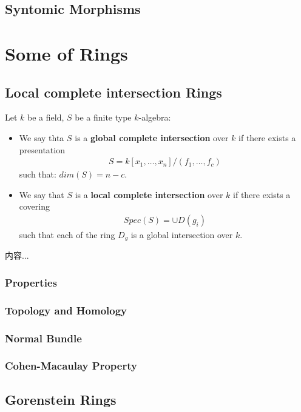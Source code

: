 \documentclass[Total.tex]{subfiles}
\begin{document}
		\section{Syntomic Morphisms}
	\chapter{Some of Rings}
		
		\section{Local complete intersection Rings}
			\begin{Def}
				Let $k$ be a field, $S$ be a finite type $k$-algebra:
				\begin{itemize}
					\item We say thta $S$ is a \textbf{global complete intersection} over $k$ if there exists a presentation
					\begin{gather*}
						S=k[x_1,\dots,x_n]/(f_1,\dots,f_c)
					\end{gather*}
					such that: $dim(S)=n-c$.
					\item We say that $S$ is a \textbf{local complete intersection} over $k$ if there exists a covering
					\begin{gather*}
						Spec(S)=\cup D(g_i)
					\end{gather*}
					such that each of the ring $D_g$ is a global intersection over $k$.
				\end{itemize}
			\end{Def}
			
			\begin{lemma}
				内容...
			\end{lemma}
			\subsection{Properties}
			\subsection{Topology and Homology}
			\subsection{Normal Bundle}
			\subsection{Cohen-Macaulay Property}
		\section{Gorenstein Rings}
		
\end{document}
